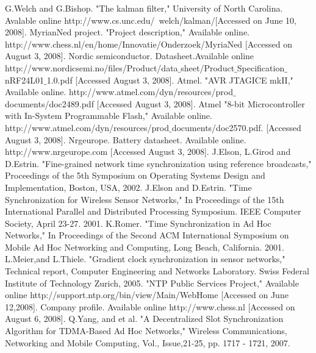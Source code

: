 \documentclass[a4paper,10pt]{report}
\begin{document}
\begin{thebibliography}{\textbf{References}}
G.Welch and G.Bishop. "The kalman filter," University of North Carolina. Avalable online http:\slash \slash www.cs.unc.edu\slash ~welch\slash kalman\slash  [Accessed on June 10, 2008].
MyrianNed project. "Project description," Available online. http:\slash \slash www.chess.nl\slash en\slash home\slash Innovatie\slash Onderzoek\slash MyriaNed [Accessed on August 3, 2008].
Nordic semiconductor. Datasheet.Available online http:\slash \slash www.nordicsemi.no\slash files\slash Product\slash data$\_$sheet\slash Product$\_$Specification$\_$nRF24L01$\_$1.0.pdf [Accessed August 3, 2008].
Atmel. "AVR JTAGICE mkII," Available online. http:\slash \slash www.atmel.com\slash dyn\slash resources\slash prod$\_$documents\slash doc2489.pdf [Accessed August 3, 2008].
Atmel "8-bit Microcontroller with In-System Programmable Flash," Available online. http:\slash \slash www.atmel.com\slash dyn\slash resources\slash prod$\_$documents\slash doc2570.pdf. [Accessed August 3, 2008].
Nrgeurope. Battery datasheet. Available online. http:\slash \slash www.nrgeurope.com [Accessed August 3, 2008].
J.Elson, L.Girod and D.Estrin. "Fine-grained network time synchronization using reference broadcasts," Proceedings of the 5th Symposium on Operating Systems Design and Implementation, Boston, USA, 2002.
J.Elson and D.Estrin. "Time Synchronization for Wireless Sensor Networks," In Proceedings of the 15th International Parallel and Distributed Processing Symposium. IEEE Computer Society, April 23-27. 2001.
K.Romer. "Time Synchronization in Ad Hoc Networks," In Proceedings of the Second ACM International Symposium on Mobile Ad Hoc Networking and Computing, Long Beach, California. 2001.
L.Meier,and L.Thiele. "Gradient clock synchronization in sensor networks," Technical report, Computer Engineering and Networks Laboratory. Swiss Federal Institute of Technology Zurich, 2005.
"NTP Public Services Project," Available online http:\slash \slash support.ntp.org\slash bin\slash view\slash Main\slash WebHome [Accessed on June 12,2008].
Company profile. Available online http://www.chess.nl [Accessed on August 6, 2008].
Q.Yang, and et al. "A Decentralized Slot Synchronization Algorithm for TDMA-Based Ad Hoc Networks," Wireless Communications, Networking and Mobile Computing, Vol., Issue,21-25, pp. 1717 - 1721, 2007.

\end{thebibliography}
\end{document}
